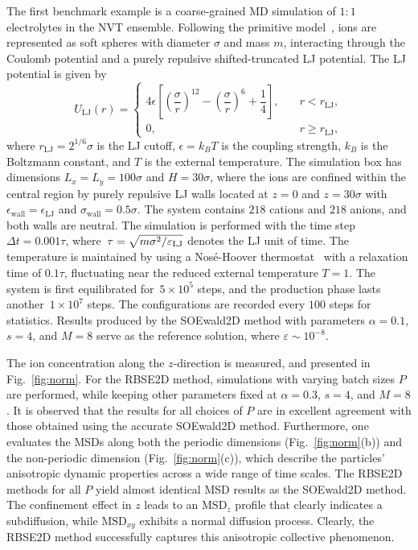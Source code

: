 The first benchmark example is a coarse-grained MD simulation of  $1:1$ electrolytes in the NVT ensemble. 
Following the primitive model~\cite{frenkel2023understanding}, ions are represented as soft spheres with diameter $\sigma$ and mass $m$, interacting through the Coulomb potential and a purely repulsive shifted-truncated LJ potential. 
The LJ potential is given by
\begin{equation}
	U_{\text{LJ}}(r) = 
	\begin{cases}
		4 \epsilon \left[ \left(\dfrac{\sigma}{r}\right)^{12}-\left(\dfrac{\sigma}{r}\right)^6 + \dfrac{1}{4}\right],\quad & r < r_{\text{LJ}}, \\
		0, & r \geq r_{\text{LJ}},
	\end{cases}
\end{equation}
where $r_{\text{LJ}} = 2^{1/6} \sigma$ is the LJ cutoff, $\epsilon = k_B T$ is the coupling strength, $k_B$ is the Boltzmann constant, and $T$ is the external temperature. 
The simulation box has dimensions $L_x = L_y = 100 \sigma$ and $H = 30 \sigma$, where the ions are confined within the central region by purely repulsive LJ walls located at $z = 0$ and $z = 30 \sigma$ with $\epsilon_{\text{wall}} = \epsilon_{\text{LJ}}$ and $\sigma_{\text{wall}} = 0.5 \sigma$. 
The system contains $218$ cations and $218$ anions, and both walls are neutral. 
The simulation is performed with the time step~$\Delta t=0.001\tau$, where~$\tau = \sqrt{m \sigma^2 / \varepsilon_{\text{LJ}}}$ denotes the LJ unit of time. 
The temperature is maintained by using a Nos\'e-Hoover thermostat~\cite{frenkel2023understanding} with a relaxation time of $0.1\tau$, fluctuating near the reduced external temperature $T=1$.
The system is first equilibrated for~$5 \times 10^5$ steps, and the production phase lasts another~$1 \times 10^7$ steps. 
The configurations are recorded every $100$ steps for statistics. Results produced by the SOEwald2D method with parameters $\alpha=0.1$, $s=4$, and $M=8$ serve as the reference solution, where $\varepsilon\sim 10^{-8}$.

The ion concentration along the $z$-direction is measured, and presented in Fig.~\ref{fig:norm}. 
For the RBSE2D method, simulations with varying batch sizes $P$ are performed, while keeping other parameters fixed at $\alpha = 0.3$, $s=4$, and $M=8$. 
It is observed that the results for all choices of $P$ are in excellent agreement with those obtained using the accurate SOEwald2D method. 
Furthermore, one evaluates the MSDs along both the periodic dimensions (Fig.~\ref{fig:norm}(b)) and the non-periodic dimension (Fig.~\ref{fig:norm}(c)), which describe the particles' anisotropic dynamic properties across a wide range of time scales. 
The RBSE2D methods for all $P$ yield almost identical MSD results as the SOEwald2D method. 
The confinement effect in $z$ leads to an $\mathrm{MSD}_z$ profile that clearly indicates a subdiffusion, while $\mathrm{MSD}_{xy}$ exhibits a normal diffusion process. 
Clearly, the RBSE2D method successfully captures this anisotropic collective phenomenon.



